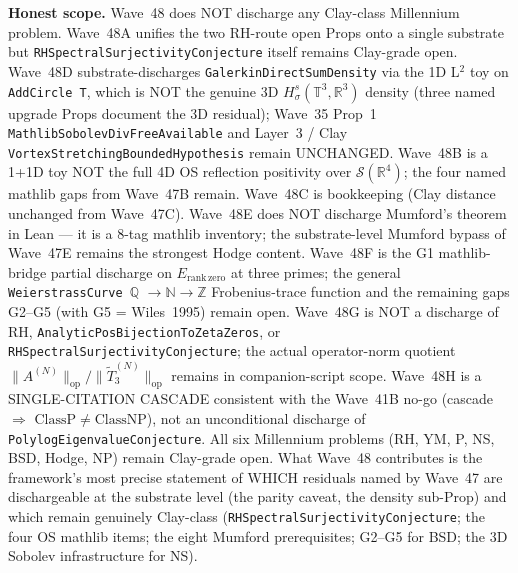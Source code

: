 \begin{remark}
\textbf{Honest scope.} Wave~48 does NOT discharge any Clay-class Millennium problem. Wave~48A unifies the two RH-route open Props onto a single substrate but \texttt{RHSpectralSurjectivityConjecture} itself remains Clay-grade open. Wave~48D substrate-discharges \texttt{GalerkinDirectSumDensity} via the 1D L$^2$ toy on \texttt{AddCircle T}, which is NOT the genuine 3D $H^s_\sigma(\mathbb{T}^3, \mathbb{R}^3)$ density (three named upgrade Props document the 3D residual); Wave~35 Prop~1 \texttt{MathlibSobolevDivFreeAvailable} and Layer~3 / Clay \texttt{VortexStretchingBoundedHypothesis} remain UNCHANGED. Wave~48B is a 1+1D toy NOT the full 4D OS reflection positivity over $\mathcal{S}(\mathbb{R}^4)$; the four named mathlib gaps from Wave~47B remain. Wave~48C is bookkeeping (Clay distance unchanged from Wave~47C). Wave~48E does NOT discharge Mumford's theorem in Lean --- it is a 8-tag mathlib inventory; the substrate-level Mumford bypass of Wave~47E remains the strongest Hodge content. Wave~48F is the G1 mathlib-bridge partial discharge on $E_{\mathrm{rank\,zero}}$ at three primes; the general \texttt{WeierstrassCurve $\mathbb{Q}$} $\to \mathbb{N} \to \mathbb{Z}$ Frobenius-trace function and the remaining gaps G2--G5 (with G5 = Wiles~1995) remain open. Wave~48G is NOT a discharge of RH, \texttt{AnalyticPosBijectionToZetaZeros}, or \texttt{RHSpectralSurjectivityConjecture}; the actual operator-norm quotient $\|A^{(N)}\|_{\mathrm{op}} / \|\widetilde{T}_3^{(N)}\|_{\mathrm{op}}$ remains in companion-script scope. Wave~48H is a SINGLE-CITATION CASCADE consistent with the Wave~41B no-go (cascade $\Rightarrow$ $\mathrm{ClassP} \neq \mathrm{ClassNP}$), not an unconditional discharge of \texttt{PolylogEigenvalueConjecture}. All six Millennium problems (RH, YM, P, NS, BSD, Hodge, NP) remain Clay-grade open. What Wave~48 contributes is the framework's most precise statement of WHICH residuals named by Wave~47 are dischargeable at the substrate level (the parity caveat, the density sub-Prop) and which remain genuinely Clay-class (\texttt{RHSpectralSurjectivityConjecture}; the four OS mathlib items; the eight Mumford prerequisites; G2--G5 for BSD; the 3D Sobolev infrastructure for NS).
\end{remark}

